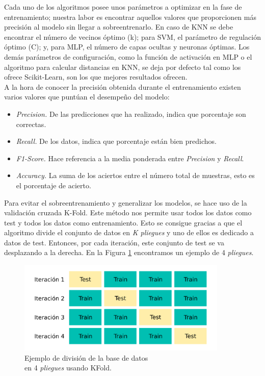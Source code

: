 Cada uno de los algoritmos posee unos parámetros a optimizar en la fase de entrenamiento; nuestra labor es encontrar aquellos valores que proporcionen más precisión al modelo sin llegar a sobreentrenarlo. En caso de KNN se debe encontrar el número de vecinos óptimo (k); para SVM, el parámetro de regulación óptimo (C); y, para MLP, el número de capas ocultas y neuronas óptimas. Los demás parámetros de configuración, como la función de activación en MLP o el algoritmo para calcular distancias en KNN, se deja por defecto tal como los ofrece Scikit-Learn, son los que mejores resultados ofrecen.\\

A la hora de conocer la precisión obtenida durante el entrenamiento existen varios valores que puntúan el desempeño del modelo:

\begin{itemize}
    \item \textit{Precision.} De las predicciones que ha realizado, indica que porcentaje son correctas.
    \item \textit{Recall.} De los datos, indica que porcentaje están bien predichos.
    \item \textit{F1-Score.} Hace referencia a la media ponderada entre \textit{Precision} y \textit{Recall}.
    \item \textit{Accuracy.} La suma de los aciertos entre el número total de muestras, esto es el porcentaje de acierto.\\
\end{itemize}

Para evitar el sobreentrenamiento y generalizar los modelos, se hace uso de la validación cruzada K-Fold. Este método nos permite usar todos los datos como test y todos los datos como entrenamiento. Esto se consigue gracias a que el algoritmo divide el conjunto de datos en \textit{K pliegues} y uno de ellos es dedicado a datos de test. Entonces, por cada iteración, este conjunto de test se va desplazando a la derecha. En la Figura \ref{fig:kfolf_explicacion} encontramos un ejemplo de 4 \textit{pliegues}.\\

\begin{figure} [h!]
  \begin{center}
    \includegraphics[width=10cm]{figs/KFold_explanation.png}
  \end{center}
  \captionsetup{justification=centering}
  \caption{Ejemplo de división de la base de datos \\
  en 4 \textit{pliegues} usando KFold.}
  \label{fig:kfolf_explicacion}
\end{figure}

